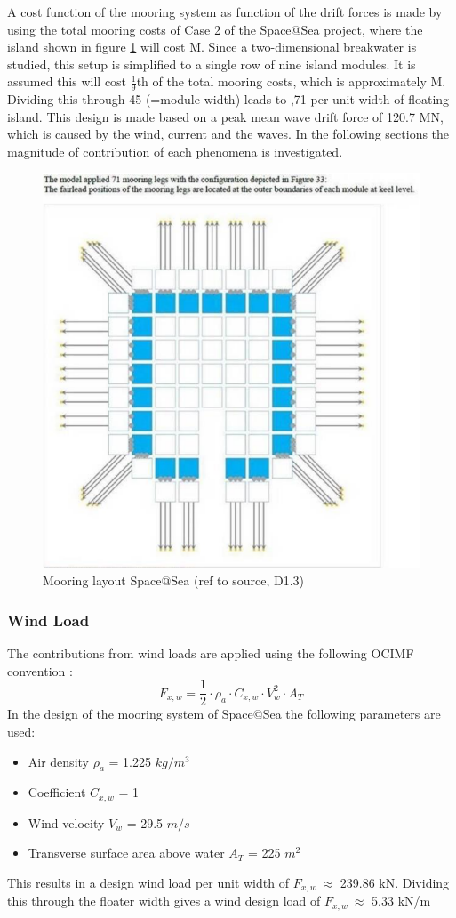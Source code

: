 A cost function of the mooring system as function of the drift forces is made by using the total mooring costs of Case 2 of the Space@Sea project, where the island shown in figure \ref{fig: mooring layout S@S} will cost  M. Since a two-dimensional breakwater is studied, this setup is simplified to a single row of nine island modules. It is assumed this will cost $\frac{1}{9}$th of the total mooring costs, which is approximately  M. Dividing this through 45 (=module width) leads to ,71 per unit width of floating island. This design is made based on a peak mean wave drift force of 120.7 MN, which is caused by the wind, current and the waves. In the following sections the magnitude of contribution of each phenomena is investigated. 
\begin{figure}[H]
    \centering
    \includegraphics[width=0.5\linewidth]{figures/Costs/mooring_layout.PNG}
    \caption{Mooring layout Space@Sea (ref to source, D1.3)}
    \label{fig: mooring layout S@S}
\end{figure}



\subsubsection{Wind Load}
The contributions from wind loads are applied using the following \acrfull{OCIMF} convention \cite{D3.3space@sea}:
\begin{equation}
    F_{x,w} = \frac{1}{2} \cdot \rho_a \cdot C_{x,w} \cdot V_w^2 \cdot A_T
\end{equation}
In the design of the mooring system of Space@Sea the following parameters are used:
\begin{itemize}
    \item Air density $\rho_a$ = 1.225 $kg/m^3$
    \item Coefficient $C_{x,w}$ = 1
    \item Wind velocity $V_w$ = 29.5 $m/s$
    \item Transverse surface area above water $A_T$ = 225 $m^2$
\end{itemize}
This results in a design wind load per unit width of $F_{x,w}~\approx$ 239.86 kN. Dividing this through the floater width gives a wind design load of $F_{x,w}~\approx$ 5.33 kN/m

